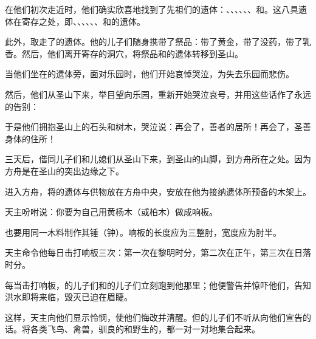 在他们初次走近时，他们确实欣喜地找到了先祖们的遗体：、、、、、、和。这八具遗体在寄存之处，即、、、、、、和的遗体。\par

此外，取走了的遗体。他的儿子们随身携带了祭品：带了黄金，带了没药，带了乳香。然后，他们离开寄存的洞穴，将祭品和的遗体转移到圣山。\par

当他们坐在的遗体旁，面对乐园时，他们开始哀悼哭泣，为失去乐园而悲伤。\par

然后，他们从圣山下来，举目望向乐园，重新开始哭泣哀号，并用这些话作了永远的告别：\par

于是他们拥抱圣山上的石头和树木，哭泣说：再会了，善者的居所！再会了，圣善身体的住所！\par

三天后，偕同儿子们和儿媳们从圣山下来，到圣山的山脚，到方舟所在之处。因为方舟是在圣山的突出边缘之下。\par

进入方舟，将的遗体与供物放在方舟中央，安放在他为接纳遗体所预备的木架上。\par

天主吩咐说：你要为自己用黄杨木（或柏木）做成响板。\par

也要用同一木料制作其锤（钟）。响板的长度应为三整肘，宽度应为肘半。\par

天主命令他每日击打响板三次：第一次在黎明时分，第二次在正午，第三次在日落时分。\par

每当击打响板，的儿子们和的儿子们立刻跑到他那里；他便警告并惊吓他们，告知洪水即将来临，毁灭已迫在眉睫。\par

这样，天主向他们显示怜悯，使他们悔改并清醒。但的儿子们不听从向他们宣告的话。将各类飞鸟、禽兽，驯良的和野生的，都一对一对地集合起来。\par

